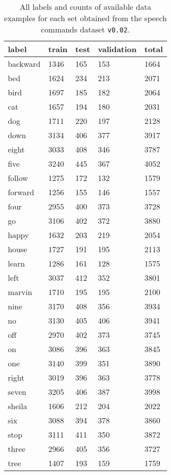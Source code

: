 \begin{table}[ht!]
\small
\begin{center}
\caption{All labels and counts of available data examples for each set obtained from the speech commands dataset \texttt{v0.02}.}
\begin{tabular}{ M{2cm}  M{1.75cm}  M{1.75cm}  M{1.75cm}  M{1.75cm} }
\toprule
\textbf{label} & \textbf{train} & \textbf{test} & \textbf{validation} & \textbf{total} \\
\midrule
backward & 1346 & 165 & 153 & 1664 \\
bed & 1624 & 234 & 213 & 2071 \\
bird & 1697 & 185 & 182 & 2064 \\
cat & 1657 & 194 & 180 & 2031 \\
dog & 1711 & 220 & 197 & 2128 \\
down & 3134 & 406 & 377 & 3917 \\
eight & 3033 & 408 & 346 & 3787 \\
five & 3240 & 445 & 367 & 4052 \\
follow & 1275 & 172 & 132 & 1579 \\
forward & 1256 & 155 & 146 & 1557 \\
four & 2955 & 400 & 373 & 3728 \\
go & 3106 & 402 & 372 & 3880 \\
happy & 1632 & 203 & 219 & 2054 \\
house & 1727 & 191 & 195 & 2113 \\
learn & 1286 & 161 & 128 & 1575 \\
left & 3037 & 412 & 352 & 3801 \\
marvin & 1710 & 195 & 195 & 2100 \\
nine & 3170 & 408 & 356 & 3934 \\
no & 3130 & 405 & 406 & 3941 \\
off & 2970 & 402 & 373 & 3745 \\
on & 3086 & 396 & 363 & 3845 \\
one & 3140 & 399 & 351 & 3890 \\
right & 3019 & 396 & 363 & 3778 \\
seven & 3205 & 406 & 387 & 3998 \\
sheila & 1606 & 212 & 204 & 2022 \\
six & 3088 & 394 & 378 & 3860 \\
stop & 3111 & 411 & 350 & 3872 \\
three & 2966 & 405 & 356 & 3727 \\
tree & 1407 & 193 & 159 & 1759 \\

\end{tabular}
\end{center}
\end{table}
